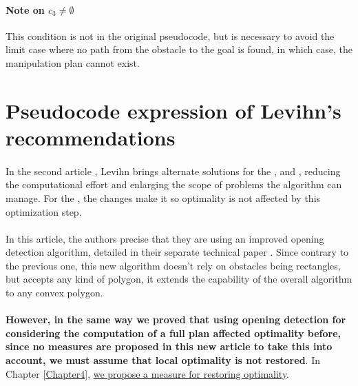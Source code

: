 \paragraph{Note on $c_{3} \neq \emptyset$}\label{c3_note} This condition is not in the original pseudocode, but is necessary to avoid the limit case where no path from the obstacle to the goal is found, in which case, the manipulation plan cannot exist.





\section{Pseudocode expression of Levihn's recommendations}

\paragraph{} In the second article \parencite{levihn_locally_2014}, Levihn brings alternate solutions for the ,  and , reducing the computational effort and enlarging the scope of problems the algorithm can manage. For the , the changes make it so optimality is not affected by this optimization step.

\paragraph{} In this article, the authors precise that they are using an improved opening detection algorithm, detailed in their separate technical paper \parencite{levihn_efficient_2011}. Since contrary to the previous one, this new algorithm doesn't rely on obstacles being rectangles, but accepts any kind of polygon, it extends the capability of the overall algorithm to any convex polygon.

\paragraph{} \textbf{However, in the same way we proved that using opening detection for considering the computation of a full plan affected optimality before, since no measures are proposed in this new article to take this into account, we must assume that local optimality is not restored}. In Chapter \ref{Chapter4}, \hyperref[check_opening_solution]{we propose a measure for restoring optimality}.

